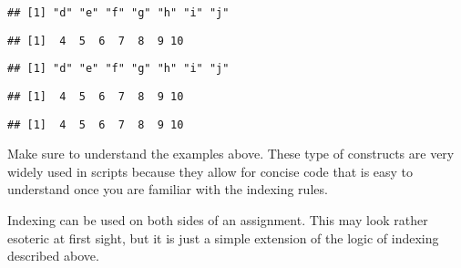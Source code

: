 \documentclass[paper=a4,10pt,div=17,headsepline,BCOR=12mm,twoside,open=right]{scrbook}\usepackage{knitr}
\begin{document}
\begin{knitrout}
\begin{kframe}
\begin{alltt}
\end{alltt}
\begin{verbatim}
## [1] "d" "e" "f" "g" "h" "i" "j"
\end{verbatim}
\begin{alltt}
 \hlopt{>} \hlstd{)}
\end{alltt}
\begin{verbatim}
## [1]  4  5  6  7  8  9 10
\end{verbatim}
\begin{alltt}
 \hlkwb{<-}  \hlopt{>} \hlstd{)}
\end{alltt}
\begin{verbatim}
## [1] "d" "e" "f" "g" "h" "i" "j"
\end{verbatim}
\begin{alltt}
 \hlkwb{<-} \hlopt{:}
\end{alltt}
\begin{verbatim}
## [1]  4  5  6  7  8  9 10
\end{verbatim}
\begin{alltt}
\end{alltt}
\begin{verbatim}
## [1]  4  5  6  7  8  9 10
\end{verbatim}
\end{kframe}
\end{knitrout}

Make sure to understand the examples above. These type of constructs are very widely used in \R scripts because they allow for concise code that is easy to understand once you are familiar with the indexing rules.

Indexing can be used on both sides of an assignment. This may look rather esoteric at first sight, but it is just a simple extension of the logic of indexing described above.
\end{document}
